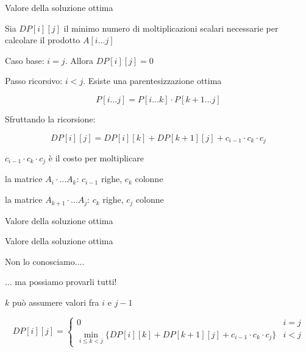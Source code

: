 \begin{frame}{Valore della soluzione ottima}

Sia \alert{$DP[i][j]$} il minimo numero di moltiplicazioni scalari necessarie per calcolare il prodotto $A[i \ldots j]$

\BIL
\item \alert{Caso base: $i=j$}. Allora $DP[i][j]=0$
\item \alert{Passo ricorsivo: $i < j$}. Esiste una parentesizzazione ottima 

\[
P[i \ldots j] = P[i \ldots k]  \cdot P[k+1 \ldots j]
\]

Sfruttando la ricorsione:

\[
DP[i][j] = DP[i][k] + DP[k+1][j] + c_{i-1} \cdot c_k \cdot c_j
\]

\item \alert{$c_{i-1} \cdot c_k \cdot c_j$} è il costo per moltiplicare
\BI
\item la matrice $A_i \cdot \ldots A_k$: $c_{i-1}$ righe, $c_k$ colonne
\item la matrice $A_{k+1} \cdot \ldots A_j$: $c_k$ righe, $c_j$ colonne
\EI
\EIL

\end{frame}

\begin{frame}{Valore della soluzione ottima}

\vspace{-6pt}

\end{frame}

\begin{frame}{Valore della soluzione ottima}

\vspace{-6pt}
\BIL
\item Non lo conosciamo....
\item ... ma possiamo provarli tutti!
\item $k$ può assumere valori fra $i$ e $j-1$
\EIL

\begin{myboxtitle}
\small
\[
  DP[i][j] = \begin{cases}
    0 & i=j \\
    \min_{i \leq k < j} \{ DP[i][k] + DP[k+1][j] + c_{i-1} \cdot c_k \cdot c_j \}  & i<j 
  \end{cases}
\]
\end{myboxtitle}

\end{frame}

